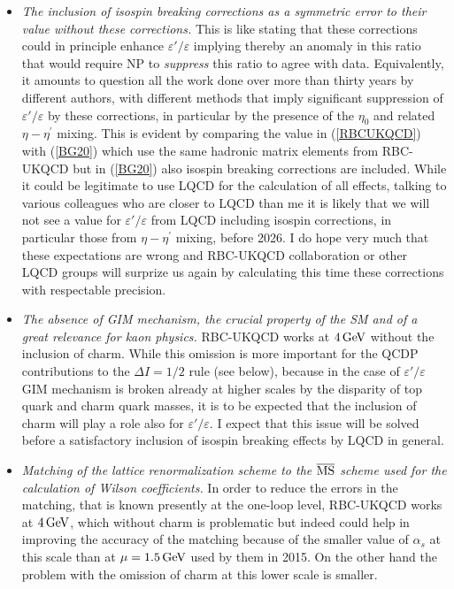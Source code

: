 \documentclass[12pt,a4paper]{article}
\newcommand{\gev}{\, {\rm GeV}}
\def\epe{\varepsilon'/\varepsilon}
\begin{document}
  \begin{itemize}
  \item
    {\em The inclusion of isospin breaking corrections as a symmetric error to their
    value without these corrections.} This is like stating that these corrections
    could in principle enhance $\epe$ implying thereby an anomaly in this ratio
    that would require NP to {\em suppress} this ratio to agree with data.
    Equivalently, it amounts to question all the work done over more than
    thirty years by different authors, with different methods that imply
    significant suppression of $\epe$ by these corrections, in particular by
    the presence of the $\eta_0$ and related $\eta-\eta^\prime$ mixing.
    This is evident by comparing the value  in (\ref{RBCUKQCD}) with
    (\ref{BG20}) which use the same hadronic matrix elements from RBC-UKQCD
    but in  (\ref{BG20}) also isospin breaking corrections are included. While
    it could be legitimate to use LQCD for the calculation of all effects, talking to
    various colleagues who are closer to LQCD than me it is likely that we will not
    see a value for $\epe$ from LQCD including isospin corrections,
    in particular those from $\eta-\eta^\prime$ mixing, before 2026. I do
    hope very much that these expectations are wrong and RBC-UKQCD collaboration or other LQCD groups will surprize us again by calculating this time  these
    corrections with respectable precision.
  \item
    {\em The absence of GIM mechanism, the crucial property of the SM and of a great
    relevance for kaon physics.} RBC-UKQCD works at $4\gev$ without the inclusion
    of charm. While this omission is more important for the QCDP contributions
    to the $\Delta I=1/2$ rule (see below), because in the case of $\epe$ GIM mechanism
    is broken already at higher scales by the disparity of top quark and charm quark masses, it is to be expected that the inclusion of charm will play a role also
    for $\epe$. I expect that this issue will be solved before a satisfactory
    inclusion of isospin breaking effects by LQCD in general.
  \item
   {\em Matching of the lattice renormalization scheme to the $\overline{\rm MS}$
    scheme used for the calculation of Wilson coefficients.} In order to
    reduce the errors in the matching, that is known presently at the one-loop
    level, RBC-UKQCD works at $4\gev$, which without charm is problematic but
    indeed could help in improving the accuracy of the matching because of the smaller value of $\alpha_s$ at this scale than at $\mu=1.5\gev$ used by them in 2015. On the other hand  the problem with the omission of charm at this lower scale is smaller.
\end{itemize}
\end{document}
